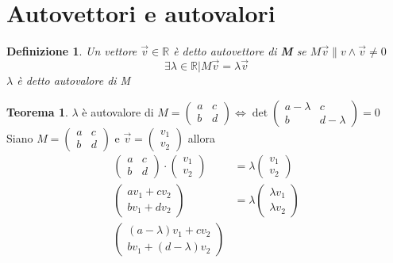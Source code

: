 \documentclass[10pt,a4paper]{article}
\theoremstyle{plain}
\newtheorem{definizione}[subsection]{Definizione}
\theoremstyle{definition}
\newtheorem{teorema}[subsection]{Teorema}
\begin{document}
\section{Autovettori e autovalori}
\begin{definizione}
	Un vettore $\vec{v} \in \mathbb{R}$ è detto autovettore di \textbf{M} se $M\vec{v}\parallel{v}\land\vec{v}\ne 0$ \\
	\[\exists \lambda \in \mathbb{R} \vert M\vec{v}=\lambda\vec{v}\]
	$\lambda$ è detto autovalore di M
\end{definizione}
\begin{teorema}$\lambda$ è autovalore di $M=\begin{pmatrix}
	a & c \\ b & d
	\end{pmatrix} \Leftrightarrow \det{\begin{pmatrix}
		a-\lambda & c \\ b & d-\lambda
		\end{pmatrix}}=0$ \\
Siano $
M=\begin{pmatrix}
a & c \\ b & d
\end{pmatrix}
$ e $\vec{v}=
\begin{pmatrix}
v_1 \\ v_2
\end{pmatrix}$ allora
\begin{align*}
	\begin{pmatrix}
	a & c \\ b & d
	\end{pmatrix}
	\cdot
	\begin{pmatrix}
	v_1 \\ v_2
	\end{pmatrix}
	&=
	\lambda
	\begin{pmatrix}
		v_1 \\ v_2
	\end{pmatrix}
	\\
	\begin{pmatrix}
	av_1 + cv_2 \\ bv_1 + dv_2
	\end{pmatrix}
	&=
	\lambda
	\begin{pmatrix}
	\lambda v_1 \\ \lambda v_2
	\end{pmatrix}
	\\
	\begin{pmatrix}
	(a-\lambda)v_1 + cv_2 \\ bv_1 + (d-\lambda)v_2

\end{pmatrix}
\end{align*}
\end{teorema}
\end{document}
